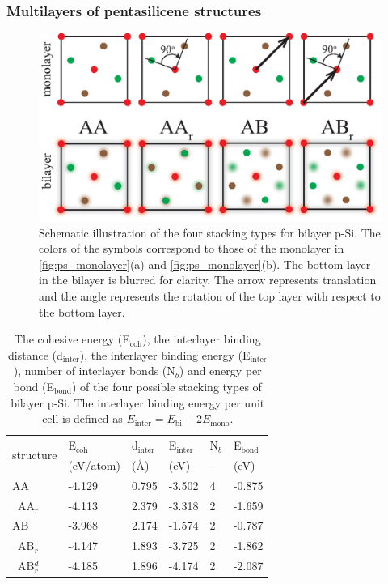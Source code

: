 \subsubsection{Multilayers of pentasilicene structures}\label{fews}

\begin{figure}[htbp]
\centering
\includegraphics[width=0.8\linewidth]{ps_stackings.eps}%
\caption{ Schematic illustration of the four stacking types for bilayer p-Si. The colors of the symbols correspond to those of the monolayer in \autoref{fig:ps_monolayer}(a) and \autoref{fig:ps_monolayer}(b). The bottom layer in the bilayer is blurred for clarity. The arrow represents translation and the angle represents the rotation of the top layer with respect to the bottom layer. \label{fig:ps_stackings}}
\end{figure}

\begin{table}[htbp]
\centering
\caption{The cohesive energy (E$_{\text{coh}}$), the interlayer binding distance (d$_{\text{inter}}$), the interlayer binding energy (E$_{\text{inter}}$), number of interlayer bonds (N$_b$) and energy per bond (E$_{\text{bond}}$) of the four possible stacking types of bilayer p-Si. The interlayer binding energy per unit cell is defined as $E_{\text{inter}}=E_{\text{bi}}-2E_{\text{mono}}$. \label{bilayer_table}}
\begin{tabularx}{\textwidth}{@{\extracolsep{\fill}}XXXXXX}
\hline
\multirow{2}{*}{structure}  & E$_{\text{coh}}$ & d$_{\text{inter}}$ & E$_{\text{inter}}$& N$_b$ & E$_{\text{bond}}$ \\ 
 & (eV/atom) & (\AA) & (eV) & - & (eV) \\ \hline
AA & -4.129 & 0.795   & -3.502  & 4 & -0.875 \\
~AA$_r$ & -4.113 & 2.379   & -3.318  & 2 & -1.659 \\
AB & -3.968 & 2.174   & -1.574  & 2 & -0.787 \\
~AB$_r$ & -4.147 & 1.893   & -3.725  & 2 & -1.862 \\
~AB$_r^d$ & -4.185 & 1.896   & -4.174  & 2 & -2.087 \\ 
\hline
\end{tabularx}
\end{table}

